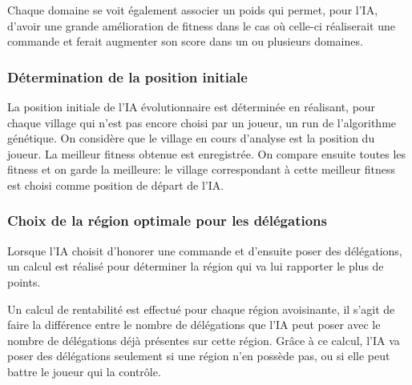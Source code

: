 		Chaque domaine se voit également associer un poids qui permet, pour l'IA, d'avoir une grande amélioration de
		fitness dans le cas où celle-ci réaliserait une commande et ferait augmenter son score dans un ou plusieurs domaines.
		
	\subsubsection{Détermination de la position initiale}
	
		La position initiale de l'IA évolutionnaire est déterminée en réalisant, pour chaque village qui n'est pas
		encore choisi par un joueur, un run de l'algorithme génétique. On considère que le village en cours d'analyse est la position du joueur. La meilleur fitness obtenue est enregistrée. On compare ensuite toutes les fitness
		et on garde la meilleure: le village correspondant à cette meilleur fitness est choisi comme position de départ de l'IA.
			
	\subsubsection{Choix de la région optimale pour les délégations}
	
		Lorsque l'IA choisit d'honorer une commande et d'ensuite poser des délégations, un calcul est réalisé pour déterminer la région qui va lui rapporter le plus de points.
		
		Un calcul de rentabilité est effectué pour chaque région avoisinante, il s'agit de faire la différence entre le nombre de délégations que l'IA peut poser avec le nombre de délégations déjà présentes sur cette région.
		Grâce à ce calcul, l'IA va poser des délégations seulement si une région n'en possède pas, ou si elle peut battre le joueur qui la contrôle.
		